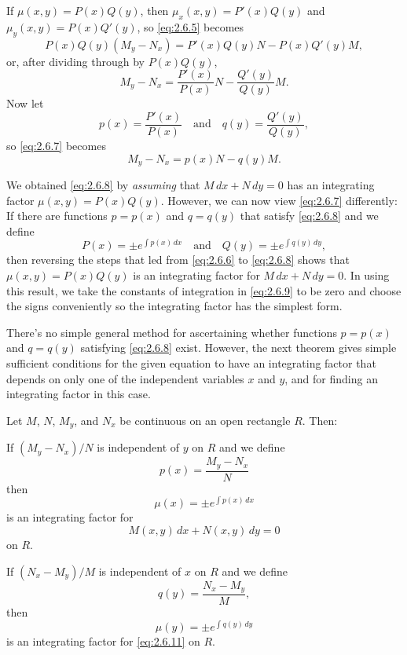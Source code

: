 If $\mu(x,y)=P(x)Q(y)$, then $\mu_x(x,y)=P'(x)Q(y)$ and
$\mu_y(x,y)=P(x)Q'(y)$, so \eqref{eq:2.6.5} becomes
\begin{equation} \label{eq:2.6.6}
P(x)Q(y)(M_y-N_x)=P'(x)Q(y)N-P(x)Q'(y)M,
\end{equation}
or, after dividing through by $P(x)Q(y)$,
\begin{equation} \label{eq:2.6.7}
M_y-N_x=\frac{P'(x)}{P(x)}N-\frac{Q'(y)}{Q(y)}M.
\end{equation}
Now let
\[
p(x)=\frac{P'(x)}{P(x)} \quad\text{and}\quad  q(y)=\frac{Q'(y)}{Q(y)},
\]
so \eqref{eq:2.6.7} becomes
\begin{equation} \label{eq:2.6.8}
M_y-N_x=p(x)N-q(y)M.
\end{equation}

We obtained \eqref{eq:2.6.8} by \emph{\color{blue}assuming} that $M\,dx+N\,dy=0$ has
an integrating factor $\mu(x,y)=P(x)Q(y)$. However, we can
now view \eqref{eq:2.6.7} differently: If there are functions $p=p(x)$
and $q=q(y)$  that satisfy \eqref{eq:2.6.8} and we define
\begin{equation} \label{eq:2.6.9}
P(x)=\pm e^{\int p(x)\,dx}\quad\text{and}\quad 
Q(y)=\pm e^{\int q(y)\,dy},
\end{equation}
then reversing the steps that led from \eqref{eq:2.6.6} to
\eqref{eq:2.6.8} shows that $\mu(x,y)=P(x)Q(y)$ is an integrating factor
for $M\,dx+N\,dy=0$. In using this result, we take the constants of
integration in \eqref{eq:2.6.9} to be zero and choose the signs
conveniently so the integrating factor has the simplest form.

There's no simple general method for ascertaining
whether functions $p=p(x)$ and $q=q(y)$ satisfying \eqref{eq:2.6.8}
exist. However, the next theorem gives simple sufficient
conditions for the given equation to have an integrating factor that
depends on only one of the independent variables $x$ and $y$, and for
finding an integrating factor in this case.

\begin{theorem}\label{thmtype:2.6.1}
Let $M$, $N$, $M_y$, and $N_x$ be continuous on an open rectangle $R$.
Then:
\begin{alist}
\item %
 If $(M_y-N_x)/N$ is independent
of $y$ on $R$ and  we define
\[
p(x)=\frac{M_y-N_x}{N}
\]
 then
\begin{equation}\label{eq:2.6.10}
\mu(x)=\pm e^{\int p(x)\,dx}
\end{equation}
is an integrating factor for
\begin{equation}\label{eq:2.6.11}
M(x,y)\,dx+N(x,y)\,dy=0
\end{equation}
on $R$.
\item %
If $(N_x-M_y)/M$ is independent of $x$ on
$R$ and we define
\[
q(y)=\frac{N_x-M_y}{M},
\]
then
\begin{equation}\label{eq:2.6.12}
\mu(y)=\pm e^{\int q(y)\,dy}
\end{equation}
 is an integrating factor for \eqref{eq:2.6.11} on $R$.
\end{alist}
\end{theorem}

